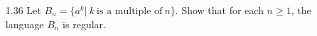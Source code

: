 \begin{enumerate}

    \item [1.36]
          Let $B_n = \{a^k |  ~k~\text{is a multiple of} ~n\}$. Show that for each $n \ge 1$, the language $B_n$ is regular.
\end{enumerate}
